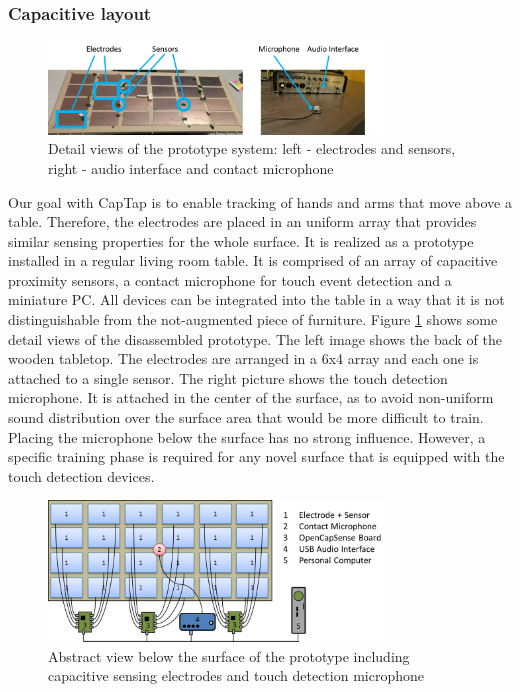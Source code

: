 \subsubsection{Capacitive layout}
\begin{figure}[ht]
\centering
\includegraphics[width=0.8\textwidth]{images/prototype_views_new}
\caption{Detail views of the prototype system: left - electrodes and sensors, right - audio interface and contact microphone}
\label{fig:prototype_views_new}
\end{figure}	
 
Our goal with CapTap is to enable tracking of hands and arms that move above a table. Therefore, the electrodes are placed in an uniform array that provides similar sensing properties for the whole surface. It is realized as a prototype installed in a regular living room table. It is comprised of an array of capacitive proximity sensors, a contact microphone for touch event detection and a miniature PC. All devices can be integrated into the table in a way that it is not distinguishable from the not-augmented piece of furniture. Figure \ref{fig:prototype_views_new} shows some detail views of the disassembled prototype. The left image shows the back of the wooden tabletop. The electrodes are arranged in a 6x4 array and each one is attached to a single sensor. The right picture shows the touch detection microphone. It is attached in the center of the surface, as to avoid non-uniform sound distribution over the surface area that would be more difficult to train. Placing the microphone below the surface has no strong influence. However, a specific training phase is required for any novel surface that is equipped with the touch detection devices. 

\begin{figure}[ht]
\centering
\includegraphics[width=0.8\textwidth]{images/captap_schematics}
\caption{Abstract view below the surface of the prototype including capacitive sensing electrodes and touch detection microphone}
\label{fig:captap_schematics}
\end{figure}

